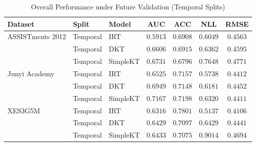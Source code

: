 \begin{table}[H]
\caption{Overall Performance under Future Validation (Temporal Splits)}
\label{tab:temporal_overall}
\centering
\small
\begin{tabular}{lllcccc}
\toprule
Dataset & Split & Model & AUC & ACC & NLL & RMSE \\
\midrule
ASSISTments 2012 & Temporal & IRT & $0.5913$ & $0.6908$ & $0.6049$ & $0.4563$ \\
 & Temporal & DKT & $0.6606$ & $0.6915$ & $0.6362$ & $0.4595$ \\
 & Temporal & SimpleKT & $0.6731$ & $0.6796$ & $0.7648$ & $0.4771$ \\
\midrule
Junyi Academy & Temporal & IRT & $0.6525$ & $0.7157$ & $0.5738$ & $0.4412$ \\
 & Temporal & DKT & $0.6949$ & $0.7148$ & $0.6181$ & $0.4452$ \\
 & Temporal & SimpleKT & $0.7167$ & $0.7198$ & $0.6320$ & $0.4411$ \\
\midrule
XES3G5M & Temporal & IRT & $0.6316$ & $0.7801$ & $0.5137$ & $0.4106$ \\
 & Temporal & DKT & $0.6429$ & $0.7097$ & $0.6429$ & $0.4441$ \\
 & Temporal & SimpleKT & $0.6433$ & $0.7075$ & $0.9014$ & $0.4694$ \\
\bottomrule
\end{tabular}
\end{table}
